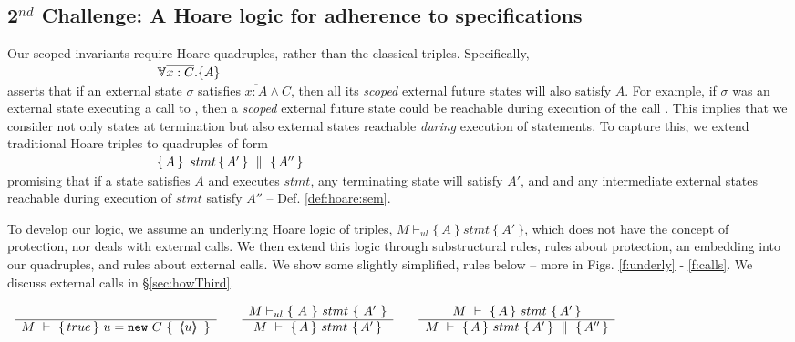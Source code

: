   
  \subsection{2$^{nd}$ Challenge:  A Hoare logic for adherence to specifications}  
 \label{sec:howSecond}

Our scoped invariants require Hoare   quadruples, rather than the classical triples.
Specifically, \\
  $\strut \ \hspace{4cm} {\TwoStatesN  {\overline{x:C}}  {A}}$\\
 asserts that if an external {state} $\sigma$ 
 satisfies $\overline {x:A} \wedge C$, then all its \emph{scoped} external future  states will  {also} satisfy  {$A$}. 
For example, if $\sigma$ was an external state executing a call to , then a \emph{scoped} external future  state
 could be reachable during execution of the   call .
This implies that we consider not only states at termination but also external states reachable
 \emph{during} execution of  statements. 
To  capture this, we extend   traditional Hoare triples to quadruples of  form\\
 $\strut \ \hspace{4cm} \quadruple {A} {\, stmt\, }{A'} {A''}$\\  
 promising that if a state satisfies $A$ and executes $stmt$, any terminating state will satisfy $A'$, and 
 and  any intermediate external states reachable during execution of $stmt$ satisfy    $A''$ -- \cf Def. \ref{def:hoare:sem}.
 
\vspace{.05cm}

To develop our logic, we   assume  an  underlying   Hoare logic  of  triples, 
$ M \vdash_{ul} \{ \ A\ \} {\ stmt\ }\{\ A'\ \} $,
which does not {have} the concept of protection, nor deals with external calls.
We then extend this logic through  
substructural rules,   rules about protection,  an embedding into our quadruples, and rules about external calls.
We show some  slightly simplified, rules below -- more in 
 Figs. \ref{f:underly} -  \ref{f:calls}.
 We discuss external calls in \S \ref{sec:howThird}.


{\footnotesize{
$
\begin{array}{lclcl}
\inferruleNoName 
	{ 
	 	
	}  	 
	{	 
 	\hproves  {M}  
	                {  true  }  
 			   {\  u = \prg{new}\ C \ }
 			   {\  \inside{u}\  } 
	} 
& &
\inferruleNoName 
	{
	 M \vdash_{ul} \{ \ A\ \} {\ stmt\ }\{\ A'\ \} 
	}  
	{ \hproves  {M}  {A} {\ stmt\ }{A'} }
	& &
\inferruleNoName 
	{  
	\hproves{M}  {A} {\ stmt \ } {A'} 
	}
	{\hprovesN{M}  {A} {\ stmt \ } {A'} {A''} }
\end{array}
$
}}

